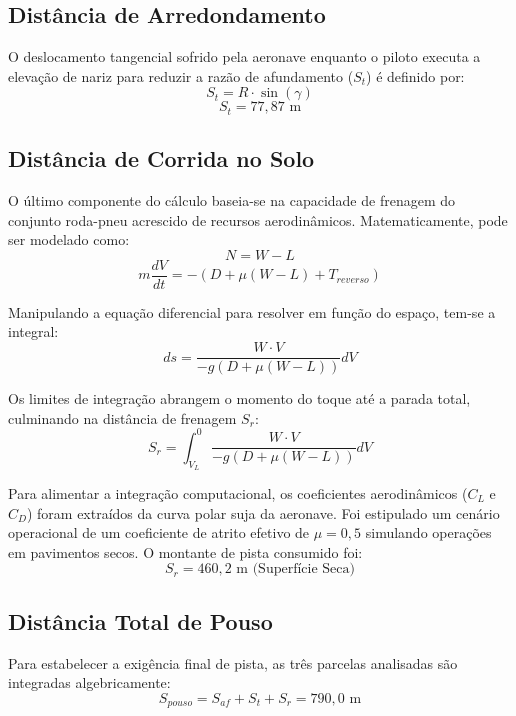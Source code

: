 \subsection{Distância de Arredondamento}
O deslocamento tangencial sofrido pela aeronave enquanto o piloto executa a elevação de nariz para reduzir a razão de afundamento ($S_{t}$) é definido por:
\begin{equation}
    S_{t} = R \cdot \sin(\gamma)
\end{equation}
\begin{equation}
    S_{t} = 77{,}87 \text{ m}
\end{equation}

\subsection{Distância de Corrida no Solo}
O último componente do cálculo baseia-se na capacidade de frenagem do conjunto roda-pneu acrescido de recursos aerodinâmicos. Matematicamente, pode ser modelado como:
\begin{equation}
    N = W - L
\end{equation}
\begin{equation}
    m\frac{dV}{dt} = -\left(D + \mu(W - L) + T_{reverso}\right)
\end{equation}

Manipulando a equação diferencial para resolver em função do espaço, tem-se a integral:
\begin{equation}
    ds = \frac{W \cdot V}{-g(D + \mu(W - L))} dV
\end{equation}

Os limites de integração abrangem o momento do toque até a parada total, culminando na distância de frenagem $S_{r}$:
\begin{equation}
    S_{r} = \int_{V_{L}}^{0} \frac{W \cdot V}{-g(D + \mu(W - L))} dV
\end{equation}

Para alimentar a integração computacional, os coeficientes aerodinâmicos ($C_{L}$ e $C_{D}$) foram extraídos da curva polar suja da aeronave. Foi estipulado um cenário operacional de um coeficiente de atrito efetivo de $\mu = 0,5$ simulando operações em pavimentos secos. O montante de pista consumido foi:
\begin{equation}
    S_{r} = 460{,}2 \text{ m (Superfície Seca)}
\end{equation}


\subsection{Distância Total de Pouso}
Para estabelecer a exigência final de pista, as três parcelas analisadas são integradas algebricamente:
\begin{equation}
    S_{pouso} = S_{af} + S_{t} + S_{r} = 790{,}0 \text{ m}
\end{equation}

